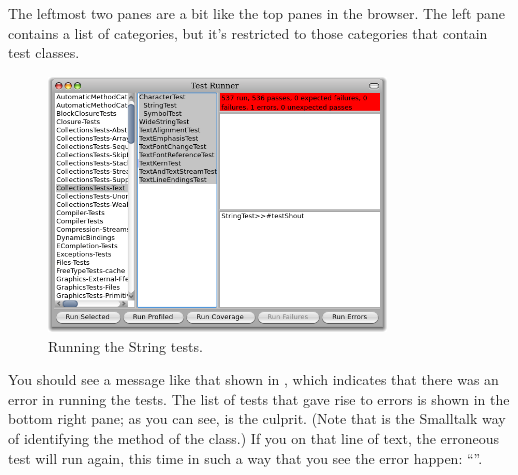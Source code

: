 \documentclass[a4paper,10pt,twoside]{book}
\begin{document}


The leftmost two panes are a bit like the top panes in the browser.  The left pane contains a list of categories, but it's restricted to those categories that contain test classes.


\begin{figure}[hbt]
\centerline {\includegraphics[width=0.8\textwidth]{testRunnerOnStringTest}}
\caption{Running the String tests.
\label{fig:testRunnerTestShout}}
\end{figure}

You should see a message like that shown in , which indicates that there was an error in running the tests.  The list of tests that gave rise to errors is shown in the bottom right pane; as you can see,  is the culprit.
(Note that  is the Smalltalk way of identifying the  method of the  class.)
If you \click on that line of text, the erroneous test will run again, this time in such a way that you see the error happen: ``''.
\end{document}
